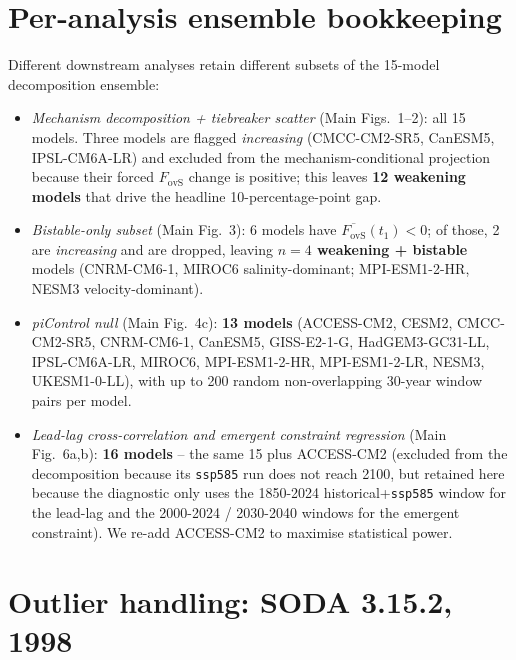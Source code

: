 \documentclass[10pt,a4paper]{article}
\newcommand{\Fovs}{F_{\mathrm{ovS}}}
\begin{document}
\section*{Per-analysis ensemble bookkeeping}
\label{si:ensemble}

Different downstream analyses retain different subsets of the 15-model
decomposition ensemble:
\begin{itemize}
\item \emph{Mechanism decomposition + tiebreaker scatter} (Main Figs.~1--2): all 15 models. Three models are flagged \emph{increasing} (CMCC-CM2-SR5, CanESM5, IPSL-CM6A-LR) and excluded from the mechanism-conditional projection because their forced $\Fovs$ change is positive; this leaves \textbf{12 weakening models} that drive the headline 10-percentage-point gap.
\item \emph{Bistable-only subset} (Main Fig.~3): 6 models have $\overline{\Fovs}(t_1)<0$; of those, 2 are \emph{increasing} and are dropped, leaving \textbf{$n=4$ weakening + bistable} models (CNRM-CM6-1, MIROC6 salinity-dominant; MPI-ESM1-2-HR, NESM3 velocity-dominant).
\item \emph{piControl null} (Main Fig.~4c): \textbf{13 models} (ACCESS-CM2, CESM2, CMCC-CM2-SR5, CNRM-CM6-1, CanESM5, GISS-E2-1-G, HadGEM3-GC31-LL, IPSL-CM6A-LR, MIROC6, MPI-ESM1-2-HR, MPI-ESM1-2-LR, NESM3, UKESM1-0-LL), with up to 200 random non-overlapping 30-year window pairs per model.
\item \emph{Lead-lag cross-correlation and emergent constraint regression} (Main Fig.~6a,b): \textbf{16 models} -- the same 15 plus ACCESS-CM2 (excluded from the decomposition because its \texttt{ssp585} run does not reach 2100, but retained here because the diagnostic only uses the 1850-2024 historical+\texttt{ssp585} window for the lead-lag and the 2000-2024 / 2030-2040 windows for the emergent constraint). We re-add ACCESS-CM2 to maximise statistical power.
\end{itemize}

\section*{Outlier handling: SODA 3.15.2, 1998}
\label{si:outlier}
\end{document}
